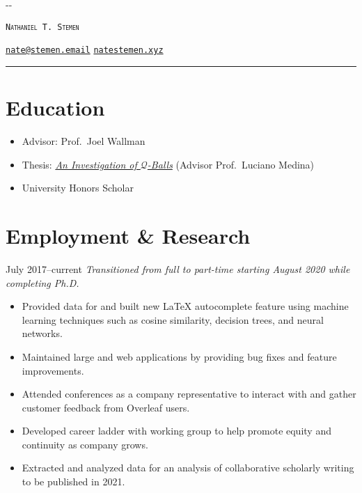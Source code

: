 \documentclass{cultvoucher}
\begin{document}
\thispagestyle{firststyle}

\begin{adjustwidth}{\dimexpr-\marginparsep-\marginparwidth}{}
	\begin{center}
		{\Huge \textsc{\texttt{Nathaniel T. Stemen}}\par}
		\href{mailto:nate@stemen.email}{\texttt{nate@stemen.email}} \textbullet{}
		\href{https://natestemen.xyz}{\texttt{natestemen.xyz}}
		\rule{\dimexpr\textwidth+\marginparsep+\marginparwidth}{0.4pt}\par
	\end{center}
\end{adjustwidth}

\section{Education}
\begin{itemize}
	\vspace{-0.25em}
	\item Advisor: Prof.\ Joel Wallman
\end{itemize}

\begin{itemize}
	\vspace{-0.25em}
	\item Thesis: \href{https://natestemen.xyz/qv-thesis.pdf}{\textit{An Investigation of $\mathcal{Q}$-Balls}} (Advisor Prof.\ Luciano Medina)
	\item University Honors Scholar
\end{itemize}

\section{Employment \& Research}
{July 2017--current}
\vspace{-0.25em}
\emph{Transitioned from full to part-time starting August 2020 while completing Ph.D.}
\begin{itemize}
	\vspace{-0.25em}
	\item Provided data for and built new \LaTeX{} autocomplete feature using machine learning techniques such as cosine similarity, decision trees, and neural networks.
	\item Maintained large  and  web applications by providing bug fixes and feature improvements.
	\item Attended conferences as a company representative to interact with and gather customer feedback from Overleaf users.
	\item Developed career ladder with working group to help promote equity and continuity as company grows.
	\item Extracted and analyzed data for an analysis of collaborative scholarly writing to be published in 2021.
\end{itemize}
\end{document}
